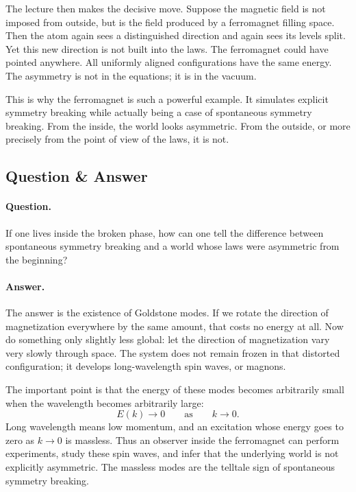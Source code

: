 The lecture then makes the decisive move. Suppose the magnetic field is not imposed from outside, but is the field produced by a ferromagnet filling space. Then the atom again sees a distinguished direction and again sees its levels split. Yet this new direction is not built into the laws. The ferromagnet could have pointed anywhere. All uniformly aligned configurations have the same energy. The asymmetry is not in the equations; it is in the vacuum.

This is why the ferromagnet is such a powerful example. It simulates explicit symmetry breaking while actually being a case of spontaneous symmetry breaking. From the inside, the world looks asymmetric. From the outside, or more precisely from the point of view of the laws, it is not.

\subsection{Question \& Answer}

\paragraph{Question.} If one lives inside the broken phase, how can one tell the difference between spontaneous symmetry breaking and a world whose laws were asymmetric from the beginning?

\paragraph{Answer.} The answer is the existence of Goldstone modes. If we rotate the direction of magnetization everywhere by the same amount, that costs no energy at all. Now do something only slightly less global: let the direction of magnetization vary very slowly through space. The system does not remain frozen in that distorted configuration; it develops long-wavelength spin waves, or magnons.

The important point is that the energy of these modes becomes arbitrarily small when the wavelength becomes arbitrarily large:
\begin{equation}
E(k)\to 0 \qquad \text{as} \qquad k\to 0.
\end{equation}
Long wavelength means low momentum, and an excitation whose energy goes to zero as \(k\to 0\) is massless. Thus an observer inside the ferromagnet can perform experiments, study these spin waves, and infer that the underlying world is not explicitly asymmetric. The massless modes are the telltale sign of spontaneous symmetry breaking.

